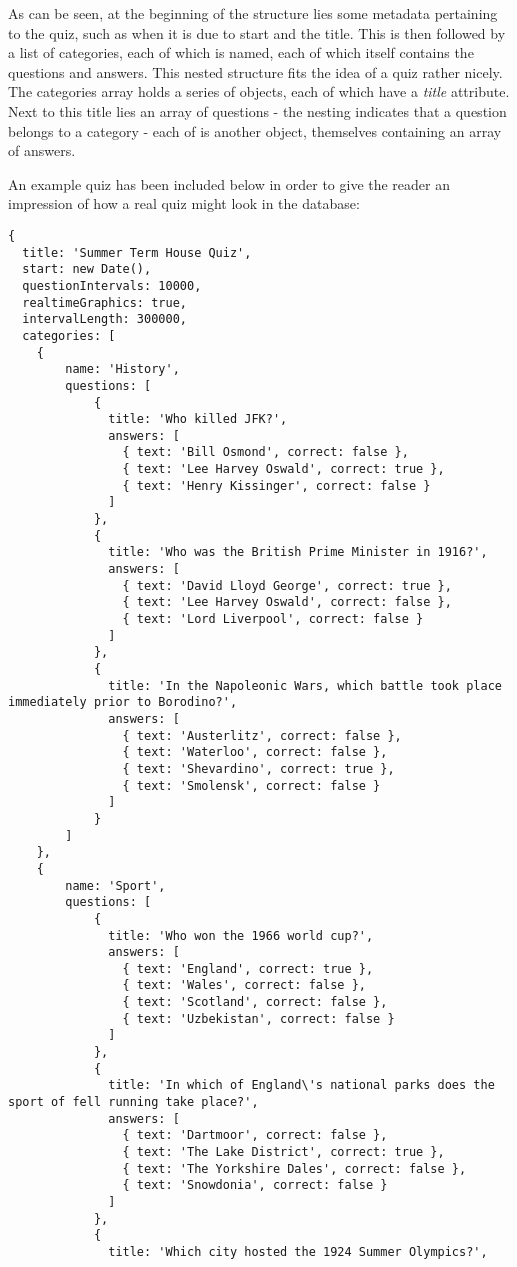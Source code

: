 As can be seen, at the beginning of the structure lies some metadata pertaining to the quiz, such as when it is due to start and the title. This is then followed by a list of categories, each of which is named, each of which itself contains the questions and answers. This nested structure fits the idea of a quiz rather nicely. The categories array holds a series of objects, each of which have a \textit{title} attribute. Next to this title lies an array of questions - the nesting indicates that a question belongs to a category - each of is another object, themselves containing an array of answers.

An example quiz has been included below in order to give the reader an impression of how a real quiz might look in the database:

\begin{verbatim}
{
  title: 'Summer Term House Quiz',
  start: new Date(),
  questionIntervals: 10000,
  realtimeGraphics: true,
  intervalLength: 300000,
  categories: [
  	{
  		name: 'History',
  		questions: [
  			{
  			  title: 'Who killed JFK?',
  			  answers: [
  			    { text: 'Bill Osmond', correct: false },
  			    { text: 'Lee Harvey Oswald', correct: true },
  			    { text: 'Henry Kissinger', correct: false }
  			  ]
  			},
  			{
  			  title: 'Who was the British Prime Minister in 1916?',
  			  answers: [
  			    { text: 'David Lloyd George', correct: true },
  			    { text: 'Lee Harvey Oswald', correct: false },
  			    { text: 'Lord Liverpool', correct: false }
  			  ]
  			},
  			{
  			  title: 'In the Napoleonic Wars, which battle took place immediately prior to Borodino?',
  			  answers: [
  			    { text: 'Austerlitz', correct: false },
  			    { text: 'Waterloo', correct: false },
  			    { text: 'Shevardino', correct: true },
  			    { text: 'Smolensk', correct: false }
  			  ]
  			}
  		]
  	},
  	{
  		name: 'Sport',
  		questions: [
  			{
  			  title: 'Who won the 1966 world cup?',
  			  answers: [
  			    { text: 'England', correct: true },
  			    { text: 'Wales', correct: false },
  			    { text: 'Scotland', correct: false },
  			    { text: 'Uzbekistan', correct: false }
  			  ]
  			},
  			{
  			  title: 'In which of England\'s national parks does the sport of fell running take place?',
  			  answers: [
  			    { text: 'Dartmoor', correct: false },
  			    { text: 'The Lake District', correct: true },
  			    { text: 'The Yorkshire Dales', correct: false },
  			    { text: 'Snowdonia', correct: false }
  			  ]
  			},
  			{
  			  title: 'Which city hosted the 1924 Summer Olympics?',

\end{verbatim}
